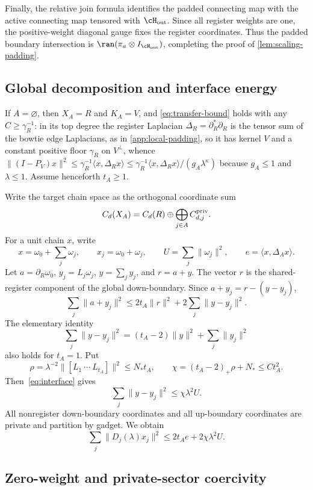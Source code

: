 Finally, the relative join formula identifies the padded connecting map with
the active connecting map tensored with
\(\cH_{\rm out}\).  Since all register weights are one, the positive-weight
diagonal gauge fixes the register coordinates.  Thus the padded boundary
intersection is \(\ran(\pi_a\otimes I_{\cH_{\rm out}})\), completing the proof
of \cref{lem:scaling-padding}.

\subsection{Global decomposition and interface energy}

If \(A=\varnothing\), then \(X_A=R\) and \(K_A=V\), and
\cref{eq:transfer-bound} holds with any \(C\ge\gamma_R^{-1}\): in its top
degree the register Laplacian \(\Delta_R=\partial_R^*\partial_R\) is the
tensor sum of the bowtie edge Laplacians, as in \cref{app:local-padding}, so
it has kernel \(V\) and a constant positive floor \(\gamma_R\) on
\(V^\perp\), whence
\(\|(I-P_V)x\|^2\le\gamma_R^{-1}\langle x,\Delta_Rx\rangle
\le\gamma_R^{-1}\langle x,\Delta_Rx\rangle/(g_A\lambda^\kappa)\)
because \(g_A\le1\) and \(\lambda\le1\).  Assume henceforth \(t_A\ge1\).

Write the target chain space as the orthogonal coordinate sum
\[
C_d(X_A)=C_d(R)\oplus\bigoplus_{j\in A}C_{d,j}^{\rm priv}.
\]
For a unit chain \(x\), write
\[
x=\omega_0+\sum_j\omega_j,
\qquad
x_j=\omega_0+\omega_j,
\qquad
U=\sum_j\|\omega_j\|^2,
\qquad
e=\langle x,\Delta_Ax\rangle.
\]
Let \(a=\partial_R\omega_0\), \(y_j=L_j\omega_j\), \(y=\sum_jy_j\), and \(r=a+y\). The vector \(r\) is the shared-register component of the global down-boundary. Since
\(
a+y_j=r-(y-y_j)
\),
\[
\sum_j\|a+y_j\|^2
\le2t_A\|r\|^2+2\sum_j\|y-y_j\|^2.
\]
The elementary identity
\[
\sum_j\|y-y_j\|^2
=(t_A-2)\|y\|^2+\sum_j\|y_j\|^2
\]
also holds for \(t_A=1\). Put
\[
\rho=\lambda^{-2}\|[L_1\ \cdots\ L_{t_A}]\|^2
\le N_*t_A,
\qquad
\chi=(t_A-2)_+\rho+N_*\le C t_A^2.
\]
Then~\cref{eq:interface} gives
\[
\sum_j\|y-y_j\|^2\le\chi\lambda^2U.
\]
All nonregister down-boundary coordinates and all up-boundary coordinates are private and partition by gadget. We obtain
\begin{equation}
\label{eq:appendix-local-energy}
\sum_j\|D_j(\lambda)x_j\|^2
\le2t_Ae+2\chi\lambda^2U.
\end{equation}

\subsection{Zero-weight and private-sector coercivity}

